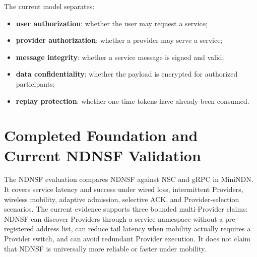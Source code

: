 The current model separates:

\begin{itemize}
  \item \textbf{user authorization}: whether the user may request a service;
  \item \textbf{provider authorization}: whether a provider may serve a
  service;
  \item \textbf{message integrity}: whether a service message is signed and
  valid;
  \item \textbf{data confidentiality}: whether the payload is encrypted for
  authorized participants;
  \item \textbf{replay protection}: whether one-time tokens have already been
  consumed.
\end{itemize}



\section{Completed Foundation and Current NDNSF Validation}

The NDNSF evaluation compares NDNSF against NSC and gRPC in MiniNDN. It covers
service latency and success under wired loss, intermittent Providers, wireless
mobility, adaptive admission, selective ACK, and Provider-selection scenarios.
The current evidence supports three bounded multi-Provider claims: NDNSF can
discover Providers through a service namespace without a pre-registered
address list, can reduce tail latency when mobility actually requires a
Provider switch, and can avoid redundant Provider execution. It does not claim
that NDNSF is universally more reliable or faster under mobility.

